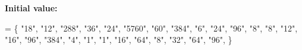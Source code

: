 {\bfseries Initial value\+:}
\begin{DoxyCode}
= \{
\textcolor{stringliteral}{"18"},
\textcolor{stringliteral}{"12"},
\textcolor{stringliteral}{"288"},
\textcolor{stringliteral}{"36"},
\textcolor{stringliteral}{"24"},
\textcolor{stringliteral}{"5760"},
\textcolor{stringliteral}{"60"},
\textcolor{stringliteral}{"384"},
\textcolor{stringliteral}{"6"},
\textcolor{stringliteral}{"24"},
\textcolor{stringliteral}{"96"},
\textcolor{stringliteral}{"8"},
\textcolor{stringliteral}{"8"},
\textcolor{stringliteral}{"12"},
\textcolor{stringliteral}{"16"},
\textcolor{stringliteral}{"96"},
\textcolor{stringliteral}{"384"},
\textcolor{stringliteral}{"4"},
\textcolor{stringliteral}{"1"},
\textcolor{stringliteral}{"1"},
\textcolor{stringliteral}{"16"},
\textcolor{stringliteral}{"64"},
\textcolor{stringliteral}{"8"},
\textcolor{stringliteral}{"32"},
\textcolor{stringliteral}{"64"},
\textcolor{stringliteral}{"96"},
\}
\end{DoxyCode}
